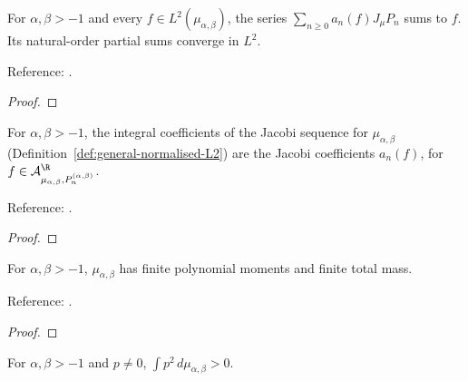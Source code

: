 \begin{theorem}
\label{thm:jacobi-L2-expansion}
\leanok
For $\alpha,\beta>-1$ and every $f\in L^2(\mu_{\alpha,\beta})$, the series $\sum_{n\ge0}a_n(f)J_\mu P_n$ sums to $f$. Its natural-order partial sums converge in $L^2$.

Reference: \cite[18.2(viii)]{dlmf}.
\end{theorem}
\begin{proof}
\leanok
\end{proof}

\begin{supporting}

\begin{theorem}
\label{thm:jacobi-coefficients-general}
\leanok
For $\alpha,\beta>-1$, the integral coefficients of the Jacobi sequence for
$\mu_{\alpha,\beta}$ (Definition~\ref{def:general-normalised-L2}) are the
Jacobi coefficients $a_n(f)$, for $f\in\mathcal A_{\mu_{\alpha,\beta},P_n^{(\alpha,\beta)}}^{\R}$.

Reference: \cite[18.2(viii)]{dlmf}.
\end{theorem}
\begin{proof}
\leanok
\end{proof}

\begin{theorem}
\label{thm:jacobi-moments}
\leanok
For $\alpha,\beta>-1$, $\mu_{\alpha,\beta}$ has finite polynomial moments and finite total mass.

Reference: \cite[Table 18.3.1]{dlmf}.
\end{theorem}
\begin{proof}
\leanok
\end{proof}

\begin{theorem}
\label{thm:jacobi-positive}
\leanok
For $\alpha,\beta>-1$ and $p\ne0$, $\int p^2\,d\mu_{\alpha,\beta}>0$.


\end{theorem}
\end{supporting}
